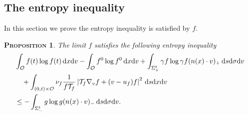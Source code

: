 \documentclass[10pt, reqno]{amsart}
\theoremstyle{plain}
\newtheorem{proposition}[theorem]{\normalfont \scshape Proposition}
\theoremstyle{definition}
\theoremstyle{remark}
\numberwithin{equation}{section}
\newcommand{\calO}{\mathcal O}
\newcommand{\calT}{\mathcal T}
\newcommand{\dx}{\textnormal{d}x}
\newcommand{\dv}{\textnormal{d}v}
\newcommand{\ds}{\textnormal{d}s}
\newcommand{\tnd}{\textnormal{d}}
\newcommand{\lt}{\left}
\newcommand{\rt}{\right}
\begin{document}
\subsection{The entropy inequality} \label{sec: entropy}
In this section we prove the entropy inequality is satisfied by $f$.

\begin{proposition}\label{prop: entropy}
The limit $f$ satisfies the following entropy inequality
    \begin{align*}
    &\int_{\calO} f(t) \log f(t) \,\dx\dv - \int_{\calO} f^0 \log f^0 \,\dx\dv + \int_{\Sigma_+^t} \gamma f \log \gamma f (n(x)\cdot v)_+ \,\ds\tnd\sigma\dv\\
    &\quad + \int_{(0,t)\times \calO} \nu_f \frac{1}{f\calT_f} \lt|\calT_f \nabla_v f + (v-u_f) f\rt|^2 \,\ds\dx\dv\\
    &\le - \int_{\Sigma_-^t} g\log g (n(x)\cdot v)_- \,\ds\tnd\sigma\dv.
    \end{align*}
\end{proposition}
\end{document}

